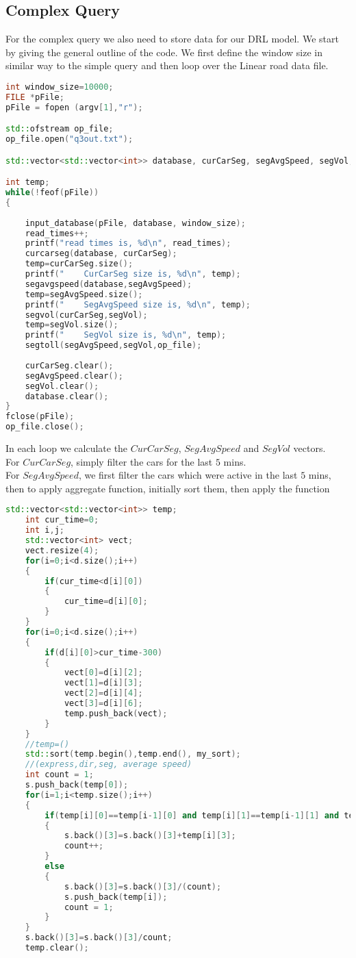 \subsection{Complex Query}
For the complex query we also need to store data for our DRL model. We start by giving the general outline of the code. We first define the window size in similar way to the simple query and then loop over the Linear road data file.
\begin{lstlisting}[language=C++]
int window_size=10000;
FILE *pFile;
pFile = fopen (argv[1],"r");

std::ofstream op_file;
op_file.open("q3out.txt");

std::vector<std::vector<int>> database, curCarSeg, segAvgSpeed, segVol;

int temp;
while(!feof(pFile))
{
    
    input_database(pFile, database, window_size);
    read_times++;
    printf("read times is, %d\n", read_times);
    curcarseg(database, curCarSeg);
    temp=curCarSeg.size();
    printf("    CurCarSeg size is, %d\n", temp);
    segavgspeed(database,segAvgSpeed);
    temp=segAvgSpeed.size();
    printf("    SegAvgSpeed size is, %d\n", temp);
    segvol(curCarSeg,segVol);
    temp=segVol.size();
    printf("    SegVol size is, %d\n", temp);
    segtoll(segAvgSpeed,segVol,op_file);
    
    curCarSeg.clear();
    segAvgSpeed.clear();
    segVol.clear();
    database.clear();
}
fclose(pFile);
op_file.close();
\end{lstlisting}
In each loop we calculate the $CurCarSeg$, $SegAvgSpeed$ and $SegVol$ vectors.\\
For $CurCarSeg$, simply filter the cars for the last $5$ mins.\\
For $SegAvgSpeed$, we first filter the cars which were active in the last $5$ mins, then to apply aggregate function, initially sort them, then apply the function 
\begin{lstlisting}[language=C++]
    std::vector<std::vector<int>> temp;
    int cur_time=0;
    int i,j;
    std::vector<int> vect;
    vect.resize(4);
    for(i=0;i<d.size();i++)
    {
        if(cur_time<d[i][0])
        {
            cur_time=d[i][0];
        }
    }
    for(i=0;i<d.size();i++)
    {
        if(d[i][0]>cur_time-300)
        {
            vect[0]=d[i][2];
            vect[1]=d[i][3];
            vect[2]=d[i][4];
            vect[3]=d[i][6];
            temp.push_back(vect);
        }
    }
    //temp=()
    std::sort(temp.begin(),temp.end(), my_sort);
    //(express,dir,seg, average speed)
    int count = 1;
    s.push_back(temp[0]);
    for(i=1;i<temp.size();i++)
    {
        if(temp[i][0]==temp[i-1][0] and temp[i][1]==temp[i-1][1] and temp[i][2]==temp[i-1][2])
        {
            s.back()[3]=s.back()[3]+temp[i][3];
            count++;
        }
        else
        {
            s.back()[3]=s.back()[3]/(count);
            s.push_back(temp[i]);
            count = 1;
        }
    }
    s.back()[3]=s.back()[3]/count;
    temp.clear();
\end{lstlisting}
